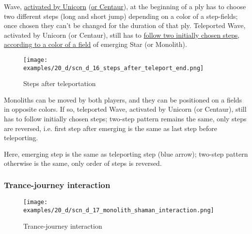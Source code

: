 Wave, \hyperref[fig:scn_mv_20_wave_activation_by_unicorn_first_step]{activated by Unicorn}
(\hyperref[fig:scn_hd_07_wave_activation_by_centaur_first_step]{or Centaur}), at the
beginning of a ply has to choose two different steps (long and short jump) depending
on a color of a step-fields; once chosen they can't be changed for the duration of
that ply. Teleported Wave, activated by Unicorn (or Centaur), still has to
\hyperref[fig:scn_n_07_teleport_wave_init]{follow two initially chosen steps},
\hyperref[fig:scn_n_09_teleport_wave_2_init]{according to a color of a field}
of emerging Star (or Monolith).

\clearpage %

\vspace*{-2.7\baselineskip}
\noindent
\begin{figure}[!h]
\texttt{[image: examples/20\_d/scn\_d\_16\_steps\_after\_teleport\_end.png]}
\vspace*{-1.4\baselineskip}
\caption{Steps after teleportation}
\label{fig:scn_d_16_steps_after_teleport_end}
\end{figure}

\vspace*{-0.5\baselineskip}
Monoliths can be moved by both players, and they can be positioned on a fields in
opposite colors. If so, teleported Wave, activated by Unicorn (or Centaur), still
has to follow initially chosen steps; two-step pattern remains the same, only steps
are reversed, i.e. first step after emerging is the same as last step before
teleporting.

Here, emerging step is the same as teleporting step (blue arrow); two-step pattern
otherwise is the same, only order of steps is reversed.

\clearpage %

\subsubsection*{Trance-journey interaction}

\vspace*{-0.9\baselineskip}
\noindent
\begin{figure}[!h]
\texttt{[image: examples/20\_d/scn\_d\_17\_monolith\_shaman\_interaction.png]}
\caption{Trance-journey interaction}
\label{fig:scn_d_17_monolith_shaman_interaction}
\end{figure}

